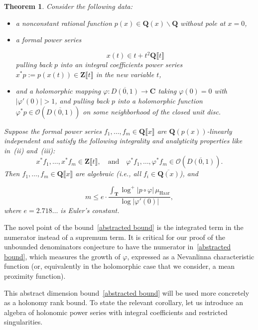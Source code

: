 \documentclass[10pt]{amsart}
\renewcommand\setminus{\smallsetminus}
\def\T{\mathbf{T}}
\def\Z{\mathbf{Z}}
\def\Q{\mathbf{Q}}
\newtheorem{thm}[subsubsection]{Theorem}
\theoremstyle{remark}
\numberwithin{equation}{subsection}
\def\numequation{\addtocounter{subsubsection}{1}\begin{equation}}
\def\C{\mathbf{C}}
\begin{document}
\begin{thm} \label{abstract form}
Consider the following data: 
\begin{itemize} 
\item[(i)] 
a nonconstant rational function $p(x) \in \Q(x) \setminus \Q$ without pole at $x=0$, 
\item[(ii)] a formal power series 
\numequation \label{normal}
x(t) \in t +  t^2 \Q\llbracket t \rrbracket
\end{equation}
 pulling back $p$ into an integral coefficients power series $x^* p := p(x(t)) \in \Z \llbracket t \rrbracket$  in the new variable $t$,
\item[(iii)]  and a holomorphic mapping $\varphi:  \overline{D(0,1)} \to \C$ taking $\varphi(0) = 0$ with $|\varphi'(0)| > 1$, and pulling back $p$ into a holomorphic function $\varphi^* p \in \mathcal{O}(\overline{D(0,1)})$  on some  neighborhood of the closed unit disc.
\end{itemize}
Suppose the formal power series $f_1, \ldots, f_m \in \Q\llbracket x \rrbracket$ are $\Q(p(x))$-linearly independent and satisfy the following integrality and analyticity properties like in~(ii) and~(iii):
$$
x^*f_1, \ldots, x^*f_m \in \Z \llbracket t \rrbracket, \quad \textrm{and} 
\quad \varphi^* f_1, \ldots, \varphi^* f_m \in \mathcal{O}(\overline{D(0,1)}).
$$
Then $f_1, \ldots, f_m \in \Q \llbracket x \rrbracket$ are algebraic (i.e., all $f_i \in \overline{\Q(x)}$), and
\numequation \label{abstracted bound}
 m  \leq  e  \cdot \frac{  \int_{\T} \log^+{|p \circ \varphi|} \, \mu_{\mathrm{Haar}}}{\log{|\varphi'(0)|}},
  \end{equation}
where $e = 2.718\ldots$ is Euler's constant. 
\end{thm}

The novel point of the bound~\eqref{abstracted bound} is the integrated term in the numerator instead of a supremum term.  It is critical for our proof of the unbounded denominators conjecture to have the numerator in~\eqref{abstracted bound}, which measures the growth of $\varphi$, expressed as a Nevanlinna characteristic function (or, equivalently in the holomorphic case that we consider, a mean proximity function).  

This abstract dimension bound~\eqref{abstracted bound} will be used more concretely as a holonomy rank bound. 
To state the relevant corollary, let  us introduce an algebra of holonomic power series with integral coefficients
and restricted singularities.
\end{document}
